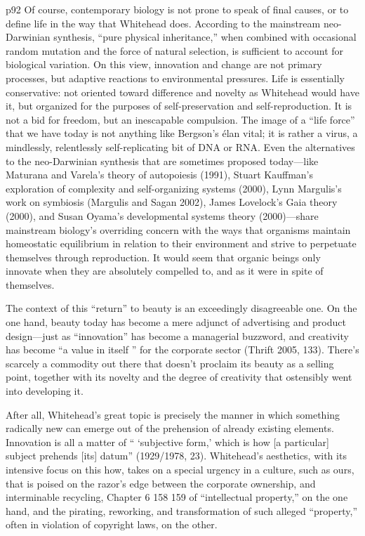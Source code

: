 p92
Of course, contemporary biology is not prone to speak of final causes,
or to define life in the way that Whitehead does. According to the mainstream
neo-Darwinian synthesis, “pure physical inheritance,” when combined with
occasional random mutation and the force of natural selection, is sufficient to
account for biological variation. On this view, innovation and change are not
primary processes, but adaptive reactions to environmental pressures. Life is
essentially conservative: not oriented toward difference and novelty as Whitehead
would have it, but organized for the purposes of self-preservation and
self-reproduction. It is not a bid for freedom, but an inescapable compulsion.
The image of a “life force” that we have today is not anything like Bergson’s
élan vital; it is rather a virus, a mindlessly, relentlessly self-replicating bit of
DNA or RNA. Even the alternatives to the neo-Darwinian synthesis that are
sometimes proposed today—like Maturana and Varela’s theory of autopoiesis
(1991), Stuart Kauffman’s exploration of complexity and self-organizing systems
(2000), Lynn Margulis’s work on symbiosis (Margulis and Sagan 2002),
James Lovelock’s Gaia theory (2000), and Susan Oyama’s developmental systems
theory (2000)—share mainstream biology’s overriding concern with
the ways that organisms maintain homeostatic equilibrium in relation to
their environment and strive to perpetuate themselves through reproduction.
It would seem that organic beings only innovate when they are absolutely
compelled to, and as it were in spite of themselves.

The context of this “return” to beauty is an exceedingly disagreeable one. On
the one hand, beauty today has become a mere adjunct of advertising and
product design—just as “innovation” has become a managerial buzzword,
and creativity has become “a value in itself ” for the corporate sector (Thrift
2005, 133). There’s scarcely a commodity out there that doesn’t proclaim its
beauty as a selling point, together with its novelty and the degree of creativity
that ostensibly went into developing it.

After all, Whitehead’s
great topic is precisely the manner in which something radically new can
emerge out of the prehension of already existing elements. Innovation is all a
matter of “ ‘subjective form,’ which is how [a particular] subject prehends [its]
datum” (1929/1978, 23). Whitehead’s aesthetics, with its intensive focus on
this how, takes on a special urgency in a culture, such as ours, that is poised on
the razor’s edge between the corporate ownership, and interminable recycling,
Chapter 6
158 159
of “intellectual property,” on the one hand, and the pirating, reworking, and
transformation of such alleged “property,” often in violation of copyright laws,
on the other.

